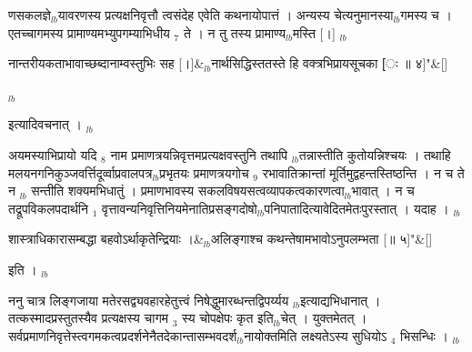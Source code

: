 \documentclass[article,12pt,a4paper]{memoir}%
\newcounter{parCount}
\begin{document}
णसकलज्ञे{\tiny $_{lb}$}यावरणस्य प्रत्यक्षनिवृत्तौ त्वसंदेह एवेति कथनायोपात्तं । अन्यस्य चेत्यनुमानस्या{\tiny $_{lb}$}गमस्य च । एतच्चागमस्य प्रामाण्यमभ्युपगम्याभिधीय {\tiny $_{7}$} ते । न तु तस्य प्रामाण्य{\tiny $_{lb}$}मस्ति [।]
	{}
	\pend%
      {\tiny $_{lb}$}
	  \bigskip
	  \begingroup
	
	    
	    \stanza[\smallbreak]
	  नान्तरीयकताभावाच्छब्दानाम्वस्तुभिः सह [।]&{\tiny $_{lb}$}नार्थसिद्धिस्ततस्ते हि वक्त्रभिप्रायसूचका [ः ॥ ४]{\normalfontlatin\large\qquad{}"}\&[\smallbreak]
	  
	  
	  
	  \endgroup
	{\tiny $_{lb}$}

	  
	  \pstart \leavevmode%
	इत्यादिवचनात् ।
	{}
	\pend%
      {\tiny $_{lb}$}

	  
	  \pstart \leavevmode%
	अयमस्याभिप्रायो यदि {\tiny $_{8}$} नाम प्रमाणत्रयन्निवृत्तमप्रत्यक्षवस्तुनि तथापि {\tiny $_{lb}$}तन्नास्तीति कुतोयन्निश्चयः । तथाहि मलयनगनिकुञ्जवर्त्तिदूर्व्वाप्रवालपत्र{\tiny $_{lb}$}प्रभृतयः प्रमाणत्रयगोच {\tiny $_{9}$}\leavevmode{} रभावातिक्रान्तां मूर्तिमुद्वहन्तस्तिष्ठन्ति । न च ते न {\tiny $_{lb}$} \leavevmode{} सन्तीति शक्यमभिधातुं । प्रमाणभावस्य सकलविषयसत्वव्यापकत्वकारणत्वा{\tiny $_{lb}$}भावात् । न च तद्रूपविकलपदार्थनि {\tiny $_{1}$} वृत्तावन्यनिवृत्तिनियमेनातिप्रसङ्गदोषो{\tiny $_{lb}$}पनिपातादित्यावेदितमेतःपुरस्तात् । यदाह । {\tiny $_{lb}$} 
	    \pend%
	  
	    
	    \stanza[\smallbreak]
	  शास्त्राधिकारासम्बद्धा बहवोऽर्थाकृतेन्द्रियाः ।&{\tiny $_{lb}$}अलिङ्गाश्च कथन्तेषामभावोऽनुपलम्भता [॥ ५]{\normalfontlatin\large\qquad{}"}\&[\smallbreak]
	  
	  
	  
	    \pstart  \leavevmode%
	    \hphantom{.}
	   इति ।
	{}
	\pend%
      {\tiny $_{lb}$}

	  
	  \pstart \leavevmode%
	ननु चात्र लिङ्गजाया मतेरसद्व्यवहारहेतुत्त्वं निषेद्धुमारब्धन्तद्विपर्य्यय {\tiny $_{lb}$}इत्याद्यभिधानात् । तत्कस्मादप्रस्तुतस्यैव प्रत्यक्षस्य चागम {\tiny $_{3}$} स्य चोपक्षेपः कृत इति{\tiny $_{lb}$}चेत् । युक्तमेतत् । सर्वप्रमाणनिवृत्तेस्त्वगमकत्वप्रदर्शनेनैतदेकान्तासम्भवदर्श{\tiny $_{lb}$}नायोक्तमिति लक्ष्यतेऽस्य सुधियोऽ {\tiny $_{4}$} भिसन्धिः ।
	{}
	\pend%
      {\tiny $_{lb}$}
\end{document}
